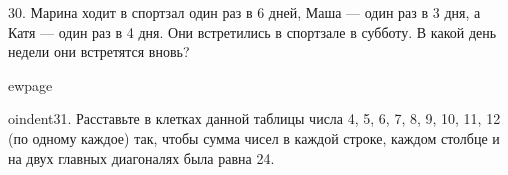 30. Марина ходит в спортзал один раз в 6 дней, Маша --- один раз в 3 дня, а Катя --- один раз в 4 дня. Они встретились в спортзале в субботу. В какой день недели они встретятся вновь?

ewpage

oindent31. Расставьте в клетках данной таблицы числа 4, 5, 6, 7, 8, 9, 10, 11, 12 (по одному каждое) так, чтобы сумма чисел в каждой строке, каждом столбце и на двух главных диагоналях была равна 24.
\begin{center}
\begin{figure}[ht!]
\end{figure}
\end{center}
